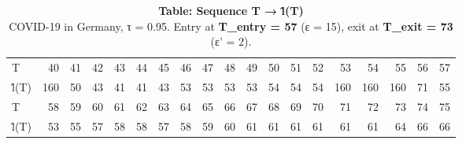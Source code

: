 \begin{table}[t]
\caption*{
{\large \textbf{Table: Sequence T → l̂(T)}} \\ 
{\small COVID-19 in Germany, τ = 0.95. Entry at \textbf{T\_entry = 57} (ε = 15), exit at \textbf{T\_exit = 73} (ε' = 2).}
} 
\begin{tabular*}{\linewidth}{@{\extracolsep{\fill}}lrrrrrrrrrrrrrrrrrr}
\toprule
 &  &  &  &  &  &  &  &  &  &  &  &  &  &  &  &  &  &  \\ 
\midrule\addlinespace[2.5pt]
T & 40 & 41 & 42 & 43 & 44 & 45 & 46 & 47 & 48 & 49 & 50 & 51 & 52 & 53 & 54 & 55 & 56 & 57 \\ 
l̂(T) & 160 & 50 & 43 & 41 & 41 & 43 & 53 & 53 & 53 & 53 & 54 & 54 & 54 & 160 & 160 & 160 & 71 & 55 \\ 
T & 58 & 59 & 60 & 61 & 62 & 63 & 64 & 65 & 66 & 67 & 68 & 69 & 70 & 71 & 72 & 73 & 74 & 75 \\ 
l̂(T) & 53 & 55 & 57 & 58 & 58 & 57 & 58 & 59 & 60 & 61 & 61 & 61 & 61 & 61 & 61 & 64 & 66 & 66 \\ 
\bottomrule
\end{tabular*}
\end{table}
